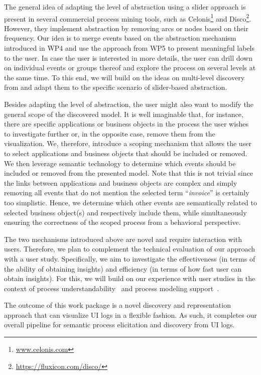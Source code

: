  The general idea of adapting the level of abstraction using a slider approach is present in several commercial process mining tools, such as Celonis\footnote{\url{www.celonis.com}} and Disco\footnote{\url{https://fluxicon.com/disco/}}. However, they implement abstraction by removing arcs or nodes based on their frequency. Our idea is to merge events based on the abstraction mechanism introduced in WP4 and use the approach from WP5 to present meaningful labels to the user. In case the user is interested in more details, the user can drill down on individual events or groups thereof and explore the process on several levels at the same time. To this end, we will build on the ideas on multi-level discovery from \cite{leemans2020using} and adapt them to the specific scenario of slider-based abstraction. 

 Besides adapting the level of abstraction, the user might also want to modify the general scope of the discovered model. It is well imaginable that, for instance, there are specific applications or business objects in the process the user wishes to investigate further or, in the opposite case, remove them from the visualization. We, therefore, introduce a scoping  mechanism that allows the user to select applications and business objects that should be included or removed. We then leverage semantic technology to determine which events should be included or removed from the presented model. Note that this is not trivial since the links between applications and business objects are complex and simply removing all events that do not mention the selected term ``\textit{invoice}'' is certainly too simplistic. Hence, we determine which other events are semantically related to selected business object(s) and respectively include them, while simultaneously ensuring the correctness of the scoped process from a behavioral perspective.    

 The two mechanisms introduced above are novel and require interaction with users. Therefore, we plan to complement the technical evaluation of our approach with a user study. Specifically, we aim to investigate the effectiveness (in terms of the ability of obtaining insights) and efficiency (in terms of how fast user can obtain insights).  For this, we will build on our experience with user studies in the context of process understandability~\cite{pittke2015automatic} and process modeling support~\cite{van2020say}.

 The outcome of this work package is a novel discovery and representation approach that can visualize UI logs in a flexible fashion. As such, it completes our overall pipeline for semantic process elicitation and discovery from UI logs.  




